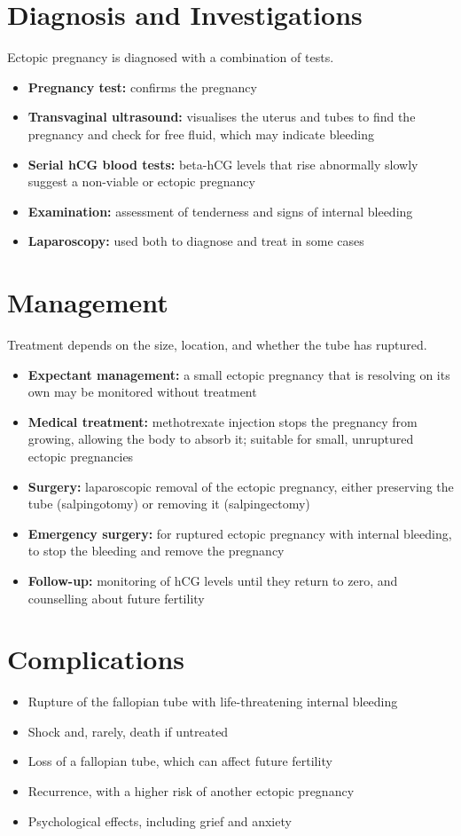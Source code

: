 \section*{Diagnosis and Investigations}
Ectopic pregnancy is diagnosed with a combination of tests.
\begin{itemize}
    \item \textbf{Pregnancy test:} confirms the pregnancy
    \item \textbf{Transvaginal ultrasound:} visualises the uterus and tubes to find the pregnancy and check for free fluid, which may indicate bleeding
    \item \textbf{Serial hCG blood tests:} beta-hCG levels that rise abnormally slowly suggest a non-viable or ectopic pregnancy
    \item \textbf{Examination:} assessment of tenderness and signs of internal bleeding
    \item \textbf{Laparoscopy:} used both to diagnose and treat in some cases
\end{itemize}

\section*{Management}
Treatment depends on the size, location, and whether the tube has ruptured.
\begin{itemize}
    \item \textbf{Expectant management:} a small ectopic pregnancy that is resolving on its own may be monitored without treatment
    \item \textbf{Medical treatment:} methotrexate injection stops the pregnancy from growing, allowing the body to absorb it; suitable for small, unruptured ectopic pregnancies
    \item \textbf{Surgery:} laparoscopic removal of the ectopic pregnancy, either preserving the tube (salpingotomy) or removing it (salpingectomy)
    \item \textbf{Emergency surgery:} for ruptured ectopic pregnancy with internal bleeding, to stop the bleeding and remove the pregnancy
    \item \textbf{Follow-up:} monitoring of hCG levels until they return to zero, and counselling about future fertility
\end{itemize}

\section*{Complications}
\begin{itemize}
    \item Rupture of the fallopian tube with life-threatening internal bleeding
    \item Shock and, rarely, death if untreated
    \item Loss of a fallopian tube, which can affect future fertility
    \item Recurrence, with a higher risk of another ectopic pregnancy
    \item Psychological effects, including grief and anxiety
\end{itemize}

